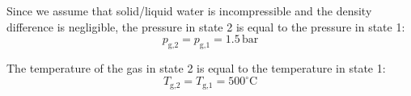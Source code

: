Since we assume that solid/liquid water is incompressible and the density difference is negligible, the pressure in state 2 is equal to the pressure in state 1:  
\[
p_{\text{g,2}} = p_{\text{g,1}} = 1.5 \, \text{bar}
\]  

The temperature of the gas in state 2 is equal to the temperature in state 1:  
\[
T_{\text{g,2}} = T_{\text{g,1}} = 500^\circ \text{C}
\]